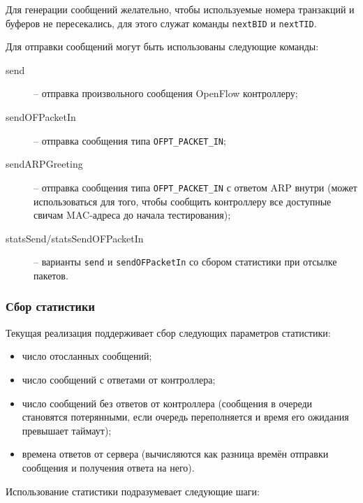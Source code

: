 \documentclass[9pt,a4paper]{article}
\begin{document}
Для генерации сообщений желательно, чтобы используемые номера транзакций и
буферов не пересекались, для этого служат команды \lstinline!nextBID! и
\lstinline!nextTID!.

Для отправки сообщений могут быть использованы следующие команды:

\begin{description}

  \item[send] -- отправка произвольного сообщения OpenFlow контроллеру;

  \item[sendOFPacketIn] -- отправка сообщения типа \lstinline!OFPT_PACKET_IN!;

  \item[sendARPGreeting] -- отправка сообщения типа \lstinline!OFPT_PACKET_IN!
    с ответом ARP внутри (может использоваться для того, чтобы сообщить
    контроллеру все доступные свичам MAC-адреса до начала тестирования);

  \item[statsSend/statsSendOFPacketIn] -- варианты \lstinline!send! и
    \lstinline!sendOFPacketIn! со сбором статистики при отсылке пакетов.

\end{description}

\subsubsection{Сбор статистики}

Текущая реализация поддерживает сбор следующих параметров статистики:

\begin{itemize}
  \item число отосланных сообщений;
  \item число сообщений с ответами от контроллера;
  \item число сообщений без ответов от контроллера (сообщения в
    очереди становятся потерянными, если очередь переполняется и время
    его ожидания превышает таймаут);
  \item времена ответов от сервера (вычисляются как разница времён отправки
    сообщения и получения ответа на него).
\end{itemize}

Использование статистики подразумевает следующие шаги:
\end{document}
